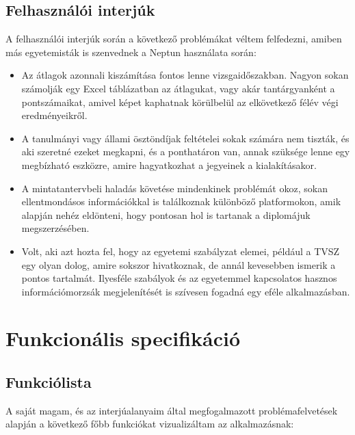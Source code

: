 \documentclass[a4paper,12pt]{report}
\begin{document}
\subsection{Felhasználói interjúk}

A felhasználói interjúk során a következő problémákat véltem felfedezni, amiben más egyetemisták is szenvednek a Neptun használata során:

\begin{itemize}
    \item Az átlagok azonnali kiszámítása fontos lenne vizsgaidőszakban. Nagyon sokan számolják egy Excel táblázatban az átlagukat, vagy akár tantárgyanként a pontszámaikat, amivel képet kaphatnak körülbelül az elkövetkező félév végi eredményeikről.
    \item A tanulmányi vagy állami ösztöndíjak feltételei sokak számára nem tiszták, és aki szeretné ezeket megkapni, és a ponthatáron van, annak szüksége lenne egy megbízható eszközre, amire hagyatkozhat a jegyeinek a kialakításakor.
    \item A mintatantervbeli haladás követése mindenkinek problémát okoz, sokan ellentmondásos információkkal is találkoznak különböző platformokon, amik alapján nehéz eldönteni, hogy pontosan hol is tartanak a diplomájuk megszerzésében.
    \item Volt, aki azt hozta fel, hogy az egyetemi szabályzat elemei, például a TVSZ egy olyan dolog, amire sokszor hivatkoznak, de annál kevesebben ismerik a pontos tartalmát. Ilyesféle szabályok és az egyetemmel kapcsolatos hasznos információmorzsák megjelenítését is szívesen fogadná egy eféle alkalmazásban.
\end{itemize}

\section{Funkcionális specifikáció}

\subsection{Funkciólista}

A saját magam, és az interjúalanyaim által megfogalmazott problémafelvetések alapján a következő főbb funkciókat vizualizáltam az alkalmazásnak:
\end{document}
